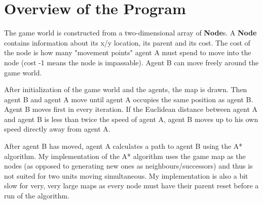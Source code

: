 \section{Overview of the Program}
The game world is constructed from a two-dimensional array of \textbf{Node}s. A \textbf{Node} contains information about its x/y location, its parent and its cost. The cost of the node is how many "movement points" agent A must spend to move into the node (cost -1 means the node is impassable). Agent B can move freely around the game world.

After initialization of the game world and the agents, the map is drawn. Then agent B and agent A move until agent A occupies the same position as agent B. Agent B moves first in every iteration. If the Euclidean distance between agent A and agent B is less than twice the speed of agent A, agent B moves up to his own speed directly away from agent A.

After agent B has moved, agent A calculates a path to agent B using the A* algorithm. My implementation of the A* algorithm uses the game map as the nodes (as opposed to generating new ones as neighbours/successors) and thus is not suited for two units moving simultaneous.  My implementation is also a bit slow for very, very large maps as every node must have their parent reset before a run of the algorithm.